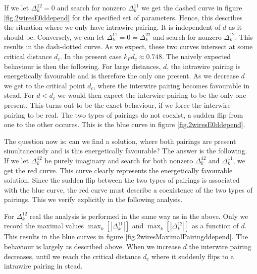 If we let $\Delta^{12}_k = 0$ and search for nonzero $\Delta^{11}_k$ we get the dashed curve in figure \ref{fig.2wiresE0ddepend} for the specified set of parameters. Hence, this describes the situation where we only have intrawire pairing. It is independent of $d$ as it should be. Conversely, we can let $\Delta^{11}_k = 0 = \Delta^{22}_k$ and search for nonzero $\Delta^{12}_k$. This results in the dash-dotted curve. As we expect, these two curves intersect at some critical distance $d_c$. In the present case $k_Fd_c \approx 0.748$. The naively expected behaviour is then the following. For large distances, $d$, the intrawire pairing is energetically favourable and is therefore the only one present. As we decrease $d$ we get to the critical point $d_c$, where the interwire pairing becomes favourable in stead. For $d < d_c$ we would then expect the interwire pairing to be the only one present. This turns out to be the exact behaviour, if we force the interwire pairing to be real. The two types of pairings do not coexist, a sudden flip from one to the other occures. This is the blue curve in figure \ref{fig.2wiresE0ddepend}. 

The question now is: can we find a solution, where both pairings are present simultaneously and is this energetically favourable? The answer is the following. If we let $\Delta^{12}_k$ be purely imaginary and search for both nonzero $\Delta^{12}_k$ and $\Delta^{11}_k$, we get the red curve. This curve clearly represents the energetically favourable solution. Since the sudden flip between the two types of pairings is associated with the blue curve, the red curve must describe a coexistence of the two types of pairings. This we verify explicitly in the following analysis. 

For $\Delta^{12}_k$ real the analysis is performed in the same way as in the above. Only we record the maximal values $\max_k\left[\left|\Delta^{11}_k\right|\right]$ and $\max_k\left[\left|\Delta^{12}_k\right|\right]$ as a function of $d$. This results in the blue curves in figure \ref{fig.2wiresMaximalPairingddepend}. The behaviour is largely as described above. When we increase $d$ the interwire pairing decreases, until we reach the critical distance $d_c$ where it suddenly flips to a intrawire pairing in stead. 

